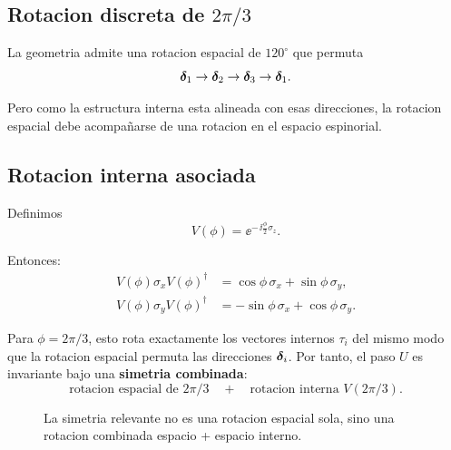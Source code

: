 \subsection{Rotacion discreta de \(2\pi/3\)}
La geometria admite una rotacion espacial de \(120^\circ\) que permuta
\begin{equation}
\bm{\delta}_1 \to \bm{\delta}_2 \to \bm{\delta}_3 \to \bm{\delta}_1.
\end{equation}

Pero como la estructura interna esta alineada con esas direcciones, la rotacion espacial debe acompa\~narse de una rotacion en el espacio espinorial.

\subsection{Rotacion interna asociada}
Definimos
\begin{equation}
V(\phi)=\ee^{-\,\ii \frac{\phi}{2}\sigma_z}.
\label{c05:eq:Vphi}
\end{equation}

Entonces:
\begin{align}
V(\phi)\sigma_x V(\phi)^\dagger &= \cos\phi\,\sigma_x + \sin\phi\,\sigma_y,\\
V(\phi)\sigma_y V(\phi)^\dagger &= -\sin\phi\,\sigma_x + \cos\phi\,\sigma_y.
\end{align}

Para \(\phi=2\pi/3\), esto rota exactamente los vectores internos \(\tau_i\) del mismo modo que la rotacion espacial permuta las direcciones \(\bm{\delta}_i\). Por tanto, el paso \(U\) es invariante bajo una \textbf{simetria combinada}:
\begin{equation}
\text{rotacion espacial de } 2\pi/3
\quad+\quad
\text{rotacion interna } V(2\pi/3).
\label{c05:eq:combined}
\end{equation}

\begin{figure}[h!]
\centering
{}
\caption{La simetria relevante no es una rotacion espacial sola, sino una rotacion combinada espacio + espacio interno.}
\end{figure}

